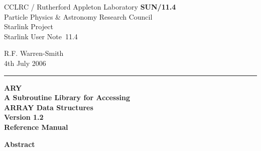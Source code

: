 \documentclass[twoside,11pt]{article}
\newcommand{\stardoccategory}  {Starlink User Note}
\newcommand{\stardocinitials}  {SUN}
\newcommand{\stardocnumber}    {11.4}
\newcommand{\stardocauthors}   {R.F. Warren-Smith}
\newcommand{\stardocdate}      {4th July 2006}
\newcommand{\stardoctitle}     {ARY\\[2.5ex]
                                A Subroutine Library for Accessing\\
                                ARRAY Data Structures}
\newcommand{\stardocversion}   {Version 1.2}
\newcommand{\stardocmanual}    {Reference Manual}
\newcommand{\stardocname}{\stardocinitials /\stardocnumber}
\newenvironment{latexonly}{}{}
\begin{document}
\thispagestyle{empty}

\begin{latexonly}
   CCLRC / {\sc Rutherford Appleton Laboratory} \hfill {\bf \stardocname}\\
   {\large Particle Physics \& Astronomy Research Council}\\
   {\large Starlink Project\\}
   {\large \stardoccategory\ \stardocnumber}
   \begin{flushright}
   \stardocauthors\\
   \stardocdate
   \end{flushright}
   \vspace{-4mm}
   \rule{\textwidth}{0.5mm}
   \vspace{5mm}
   \begin{center}
   {\Huge\bf  \stardoctitle \\ [2.5ex]}
   {\LARGE\bf \stardocversion \\ [4ex]}
   {\Huge\bf  \stardocmanual}
   \end{center}
   \vspace{5mm}


   \vspace{10mm}
   \begin{center}
      {\Large\bf Abstract}
   \end{center}
\end{latexonly}
\end{document}
